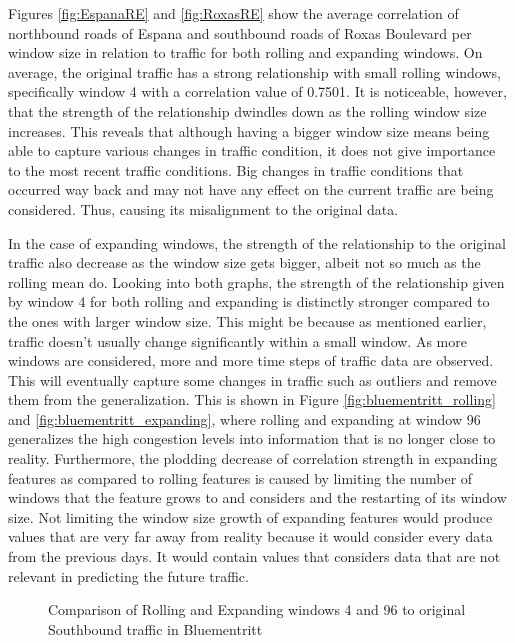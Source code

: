 Figures  \ref{fig:EspanaRE} and  \ref{fig:RoxasRE} show the average correlation of northbound roads of Espana and southbound roads of Roxas Boulevard per window size in relation to traffic for both rolling and expanding windows. On average, the original traffic has a strong relationship with small rolling windows, specifically window 4 with a correlation value of 0.7501. It is noticeable, however, that the strength of the relationship dwindles down as the rolling window size increases. This reveals that although having a bigger window size means being able to capture various changes in traffic condition, it does not give importance to the most recent traffic conditions. Big changes in traffic conditions that occurred way back and may not have any effect on the current traffic are being considered. Thus, causing its misalignment to the original data. 

In the case of expanding windows, the strength of the relationship to the original traffic also decrease as the window size gets bigger, albeit not so much as the rolling mean do. Looking into both graphs, the strength of the relationship given by window 4 for both rolling and expanding is distinctly stronger compared to  the ones with larger window size. This might be because as mentioned earlier, traffic doesn’t usually change significantly within a small window. As more windows are considered, more and more time steps of traffic data are observed. This will eventually capture some changes in traffic such as outliers and remove them from the generalization. This is shown in Figure \ref{fig:bluementritt_rolling} and \ref{fig:bluementritt_expanding}, where rolling and expanding at window 96 generalizes the high congestion levels into information that is no longer close to reality. Furthermore, the plodding decrease of correlation strength in expanding features as compared to rolling features is caused by limiting the number of windows that the feature grows to and considers and the restarting of its window size. Not limiting the window size growth of expanding features would produce values that are very far away from reality because it would consider every data from the previous days. It would contain values that considers data that are not relevant in predicting the future traffic.

\begin{figure}
  	\centering
    	\captionsetup{justification=centering}
  	\hfill
  	\caption{Comparison of Rolling and Expanding windows 4 and 96 to original Southbound traffic in Bluementritt}
\end{figure}

